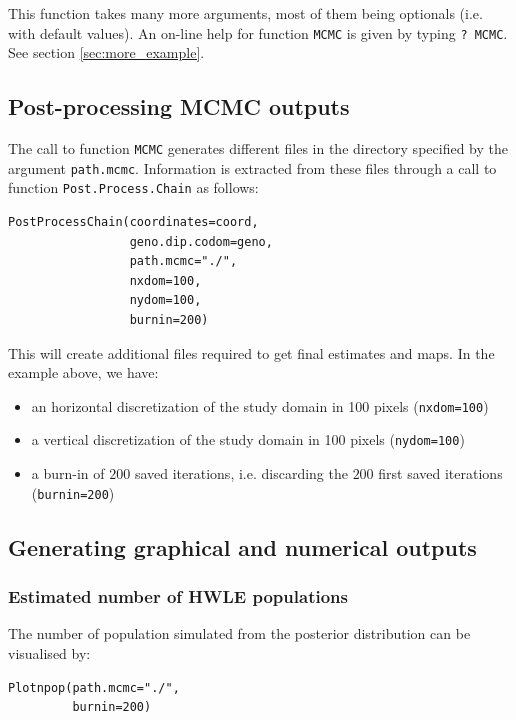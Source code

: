 \documentclass[a4paper,10pt]{article}
\begin{document}
 
This function takes many more arguments, most of them being optionals (i.e. with default values).
An on-line help for function \texttt{MCMC} is given by typing \texttt{? MCMC}. See section \ref{sec:more_example}.


\subsection{Post-processing MCMC outputs}

The call to function \texttt{MCMC} generates different files in the directory specified by the argument \texttt{path.mcmc}. 
Information is extracted from these files through a call to function \texttt{Post.Process.Chain} 
as follows:

\begin{verbatim}
PostProcessChain(coordinates=coord,
                 geno.dip.codom=geno,
                 path.mcmc="./",
                 nxdom=100,
                 nydom=100,
                 burnin=200)
\end{verbatim}



This will create additional files required to get final estimates and maps. In the example above, we have: 
\begin{itemize}
\item an horizontal  discretization of the study domain in 100 pixels (\texttt{nxdom=100})
\item a vertical  discretization of the study domain in 100 pixels (\texttt{nydom=100})
\item a burn-in of $200$ saved  iterations, i.e. discarding the $200$ first saved iterations (\texttt{burnin=200})
\end{itemize}


\subsection{Generating graphical and numerical outputs}

\subsubsection{Estimated number  of HWLE populations}
The number of population simulated from the posterior distribution can be visualised by:

\begin{verbatim}
Plotnpop(path.mcmc="./",
         burnin=200)
\end{verbatim}
\end{document}
